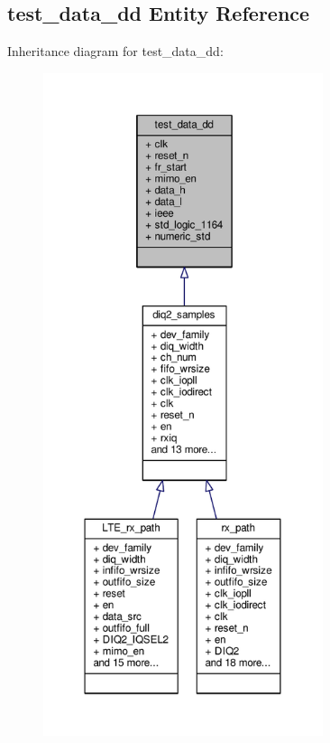 \subsection{test\+\_\+data\+\_\+dd Entity Reference}
\label{classtest__data__dd}


Inheritance diagram for test\+\_\+data\+\_\+dd\+:\nopagebreak
\begin{figure}[H]
\begin{center}
\leavevmode
\includegraphics[height=550pt]{d6/d1b/classtest__data__dd__inherit__graph}
\end{center}
\end{figure}


